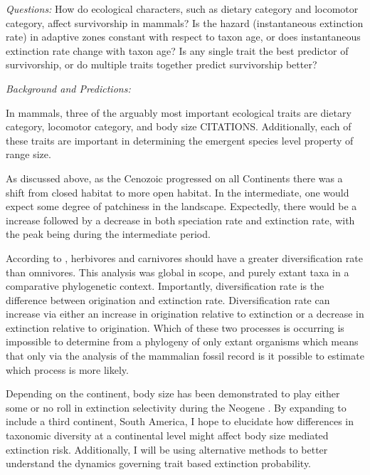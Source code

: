 \documentclass[12pt,letterpaper]{article}
\begin{document}
\textit{Questions:} How do ecological characters, such as dietary category and locomotor category, affect survivorship in mammals? Is the hazard (instantaneous extinction rate) in adaptive zones constant with respect to taxon age, or does instantaneous extinction rate change with taxon age? Is any single trait the best predictor of survivorship, or do multiple traits together predict survivorship better?

\textit{Background and Predictions:} 

In mammals, three of the arguably most important ecological traits are dietary category, locomotor category, and body size CITATIONS. Additionally, each of these traits are important in determining the emergent species level property of range size. 


As discussed above, as the Cenozoic progressed on all Continents there was a shift from closed habitat to more open habitat. In the intermediate, one would expect some degree of patchiness in the landscape. Expectedly, there would be a increase followed by a decrease in both speciation rate and extinction rate, with the peak being during the intermediate period.

According to \citet{Price2012}, herbivores and carnivores should have a greater diversification rate than omnivores. This analysis was global in scope, and purely extant taxa in a comparative phylogenetic context. Importantly, diversification rate is the difference between origination and extinction rate. Diversification rate can increase via either an increase in origination relative to extinction or a decrease in extinction relative to origination. Which of these two processes is occurring is impossible to determine from a phylogeny of only extant organisms \citep{Rabosky2010a} which means that only via the analysis of the mammalian fossil record is it possible to estimate which process is more likely. 

Depending on the continent, body size has been demonstrated to play either some or no roll in extinction selectivity during the Neogene \citep{Tomiya2013,Liow2008,Liow2009}. By expanding to include a third continent, South America, I hope to elucidate how differences in taxonomic diversity at a continental level might affect body size mediated extinction risk. Additionally, I will be using alternative methods to better understand the dynamics governing trait based extinction probability.
\end{document}
